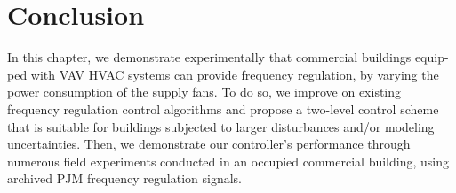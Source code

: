 \section{Conclusion}\label{sec:conclusions}
In this chapter, we demonstrate experimentally that commercial buildings equip-ped with VAV HVAC systems can provide frequency regulation, by varying the power consumption of the supply fans.
To do so, we improve on existing frequency regulation control algorithms and propose a two-level control scheme that is suitable for buildings subjected to larger disturbances and/or modeling uncertainties.
Then, we demonstrate our controller's performance through numerous field experiments conducted in an occupied commercial building, using archived PJM frequency regulation signals.


